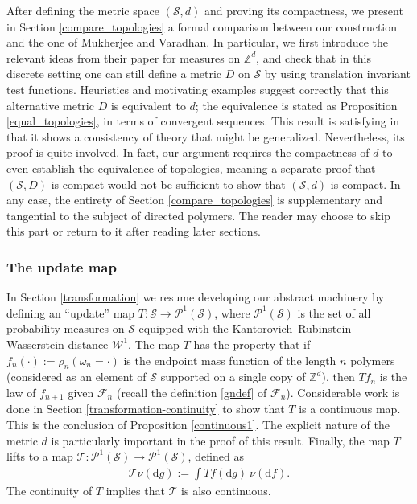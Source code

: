 \documentclass[11pt,reqno]{amsart}
\numberwithin{equation}{section}
\theoremstyle{definition}
\begin{document}
After defining the metric space $({\mathcal{S}},d)$ and proving its compactness, we present in Section \ref{compare_topologies} a formal comparison between our construction and the one of Mukherjee and Varadhan.
In particular, we first introduce the relevant ideas from their paper \cite{mukherjee-varadhan14} for measures on ${\mathbb{Z}}^d$, and check that in this discrete setting one can still define a metric $D$ on ${\mathcal{S}}$ by using translation invariant test functions.
Heuristics and motivating examples suggest correctly that this alternative metric $D$ is equivalent to $d$;
the equivalence is stated as Proposition \ref{equal_topologies}, in terms of convergent sequences.
This result is satisfying in that it shows a consistency of theory that might be generalized.
Nevertheless, its proof is quite involved.
In fact, our argument requires the compactness of $d$ to even establish the equivalence of topologies, meaning a separate proof that $({\mathcal{S}},D)$ is compact would not be sufficient to show that $({\mathcal{S}},d)$ is compact.
In any case, the entirety of Section \ref{compare_topologies} is supplementary and tangential to the subject of directed polymers.
The reader may choose to skip this part or return to it after reading later sections.

\subsubsection{The update map}
In Section \ref{transformation} we resume developing our abstract machinery by defining an ``update'' map $T:{\mathcal{S}} \to {\mathcal{P}}^1({\mathcal{S}})$,  where ${\mathcal{P}}^1({\mathcal{S}})$ is the set of all probability measures on ${\mathcal{S}}$ equipped with the Kantorovich--Rubinstein--Wasserstein  distance  ${\mathcal{W}}^1$. The map $T$ has the property that if $f_n(\cdot) := \rho_n(\omega_n = \cdot)$ is the endpoint mass function of the length $n$ polymers (considered as an element of ${\mathcal{S}}$ supported on a single copy of ${\mathbb{Z}}^d$), then $Tf_n$ is the law of $f_{n+1}$ given ${\mathcal{F}}_n$ (recall the definition \eqref{gndef} of ${\mathcal{F}}_n$). Considerable work is done in Section \ref{transformation-continuity} to show that $T$ is a continuous map.  This is the conclusion of Proposition \ref{continuous1}. The explicit nature of the metric $d$ is particularly important in the proof of this result.
Finally, the map $T$ lifts to a map ${\mathcal{T}}: {\mathcal{P}}^1({\mathcal{S}}) \to {\mathcal{P}}^1({\mathcal{S}})$, defined as
{\begin{align*} {
{\mathcal{T}} \nu({\mathrm{d}} g) := \int Tf({\mathrm{d}} g)\ \nu({\mathrm{d}} f).
} \end{align*}}
The continuity of $T$ implies that ${\mathcal{T}}$ is also continuous.
\end{document}
